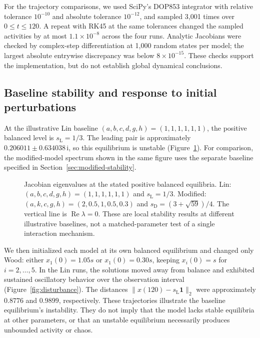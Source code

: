 For the trajectory comparisons, we used SciPy's DOP853 integrator with
relative tolerance $10^{-10}$ and absolute tolerance $10^{-12}$, and
sampled 3,001 times over $0\leq t\leq120$. A repeat with RK45 at the same
tolerances changed the sampled activities by at most $1.1\times10^{-8}$
across the four runs. Analytic Jacobians were checked by complex-step
differentiation at 1,000 random states per model; the largest absolute
entrywise discrepancy was below $8\times10^{-15}$. These checks support
the implementation, but do not establish global dynamical conclusions.

\subsection{Baseline stability and response to initial perturbations}
At the illustrative Lin baseline
$(a,b,c,d,g,h)=(1,1,1,1,1,1)$, the positive balanced level is
$s_{\mathrm L}=1/3$. The leading pair is approximately
$0.206011\pm0.634038\,\mathrm{i}$, so this equilibrium is unstable
(Figure~\ref{fig:baseline-spectra}).
For comparison, the modified-model spectrum shown in the same figure uses
the separate baseline specified in Section~\ref{sec:modified-stability}.

\begin{figure}[tbp]
\centering
\PreliminaryEigenFigure
\caption{Jacobian eigenvalues at the stated positive balanced equilibria.
Lin: $(a,b,c,d,g,h)=(1,1,1,1,1,1)$ and $s_{\mathrm L}=1/3$.
Modified: $(a,k,c,g,h)=(2,0.5,1,0.5,0.3)$ and
$s_{\mathrm D}=(3+\sqrt{59})/4$.
The vertical line is $\operatorname{Re}\lambda=0$.
These are local stability results at different illustrative baselines,
not a matched-parameter test of a single interaction mechanism.}
\label{fig:baseline-spectra}
\end{figure}

We then initialized each model at its own balanced equilibrium and changed
only Wood: either $x_1(0)=1.05s$ or $x_1(0)=0.30s$, keeping
$x_i(0)=s$ for $i=2,\ldots,5$.
In the Lin runs, the solutions moved away from balance and exhibited
sustained oscillatory behavior over the observation interval
(Figure~\ref{fig:disturbance}). The distances
$\lVert x(120)-s_{\mathrm L}\mathbf{1}\rVert_2$ were approximately
$0.8776$ and $0.9899$, respectively. These trajectories illustrate the
baseline equilibrium's instability. They do not imply that the model lacks
stable equilibria at other parameters, or that an unstable equilibrium
necessarily produces unbounded activity or chaos.

